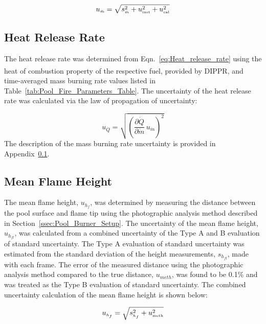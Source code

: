 \documentclass[12pt]{article}
\begin{document}
\begin{equation}
\label{eq:mass_rate_uncertainty}
u_{\scriptscriptstyle \dot{m}} = \sqrt{s_{\scriptscriptstyle \dot{m}}^2+u_{\rm \scriptscriptstyle inst}^2+u_{\rm \scriptscriptstyle cal}^2}
\end{equation}
 
\subsection{Heat Release Rate}
\label{ssec:Heat_Release_Rate}
The heat release rate was determined from Eqn.~\ref{eq:Heat_release_rate} using the heat of combustion property of the respective fuel, provided by DIPPR\textsuperscript{\textregistered}, and time-averaged mass burning rate values listed in Table~\ref{tab:Pool_Fire_Parameters_Table}. The uncertainty of the heat release rate was calculated via the law of propagation of uncertainty:

\begin{equation}
\label{eq:heat_release_rate_uncertainty}
u_{\scriptscriptstyle \dot{Q}} = \sqrt{{\left(\frac{\partial \dot{Q}}{\partial \dot{m}}\,u_{\scriptscriptstyle \dot{m}} \right)}^2}
\end{equation}
The description of the mass burning rate uncertainty is provided in Appendix~\ref{ssec:Heat_Release_Rate}.

\subsection{Mean Flame Height}
\label{ssec:Mean_Flame_Height}
The mean flame height, $u_{h_{f}}$, was determined by measuring the distance between the pool surface and flame tip using the photographic analysis method described in Section~\ref{ssec:Pool_Burner_Setup}. The uncertainty of the mean flame height, $u_{\scriptscriptstyle h_{fl}}$, was calculated from a combined uncertainty of the Type A and B evaluation of standard uncertainty. The Type A evaluation of standard uncertainty was estimated from the standard deviation of the height measurements, $s_{\scriptscriptstyle h_{fl}}$, made with each frame. The error of the measured distance using the photographic analysis method compared to the true distance, $u_{\scriptscriptstyle meth}$,  was found to be 0.1\% and was treated as the Type B evaluation of standard uncertainty. The combined uncertainty calculation of the mean flame height is shown below:

\begin{equation}
\label{eq:mean_flame_height}
u_{\scriptscriptstyle h_{f}} = \sqrt{s_{\scriptscriptstyle{h_{f}}}^2+u_{\rm \scriptscriptstyle meth}^2}
\end{equation}
\end{document}
